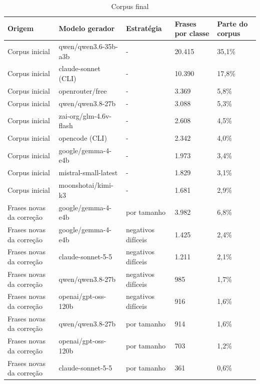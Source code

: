 \documentclass[
    12pt,                %
    openright,           %
    oneside,             %
    a4paper,             %
    english,             %
    brazil               %
]{abntex2}
\begin{document}
\begin{table}[htb]
\centering
\caption{Corpus final}
\label{tab:corpus_final}
\footnotesize
\begin{tabularx}{\textwidth}{lZZZZ}
\toprule
Origem & Modelo gerador & Estratégia & Frases por classe & Parte do corpus \\
\midrule
Corpus inicial & qwen/\allowbreak{}qwen3.6-\allowbreak{}35b-\allowbreak{}a3b & - & 20.415 & 35,1\% \\
Corpus inicial & claude-\allowbreak{}sonnet (CLI) & - & 10.390 & 17,8\% \\
Corpus inicial & openrouter/\allowbreak{}free & - & 3.369 & 5,8\% \\
Corpus inicial & qwen/\allowbreak{}qwen3.8-\allowbreak{}27b & - & 3.088 & 5,3\% \\
Corpus inicial & zai-\allowbreak{}org/\allowbreak{}glm-\allowbreak{}4.6v-\allowbreak{}flash & - & 2.608 & 4,5\% \\
Corpus inicial & opencode (CLI) & - & 2.342 & 4,0\% \\
Corpus inicial & google/\allowbreak{}gemma-\allowbreak{}4-\allowbreak{}e4b & - & 1.973 & 3,4\% \\
Corpus inicial & mistral-\allowbreak{}small-\allowbreak{}latest & - & 1.829 & 3,1\% \\
Corpus inicial & moonshotai/\allowbreak{}kimi-\allowbreak{}k3 & - & 1.681 & 2,9\% \\
Frases novas da correção & google/\allowbreak{}gemma-\allowbreak{}4-\allowbreak{}e4b & por tamanho & 3.982 & 6,8\% \\
Frases novas da correção & google/\allowbreak{}gemma-\allowbreak{}4-\allowbreak{}e4b & negativos difíceis & 1.425 & 2,4\% \\
Frases novas da correção & claude-\allowbreak{}sonnet-\allowbreak{}5-\allowbreak{}5 & negativos difíceis & 1.211 & 2,1\% \\
Frases novas da correção & qwen/\allowbreak{}qwen3.8-\allowbreak{}27b & negativos difíceis & 985 & 1,7\% \\
Frases novas da correção & openai/\allowbreak{}gpt-\allowbreak{}oss-\allowbreak{}120b & negativos difíceis & 916 & 1,6\% \\
Frases novas da correção & qwen/\allowbreak{}qwen3.8-\allowbreak{}27b & por tamanho & 914 & 1,6\% \\
Frases novas da correção & openai/\allowbreak{}gpt-\allowbreak{}oss-\allowbreak{}120b & por tamanho & 703 & 1,2\% \\
Frases novas da correção & claude-\allowbreak{}sonnet-\allowbreak{}5-\allowbreak{}5 & por tamanho & 361 & 0,6\% \\

\end{tabularx}
\end{table}
\end{document}
